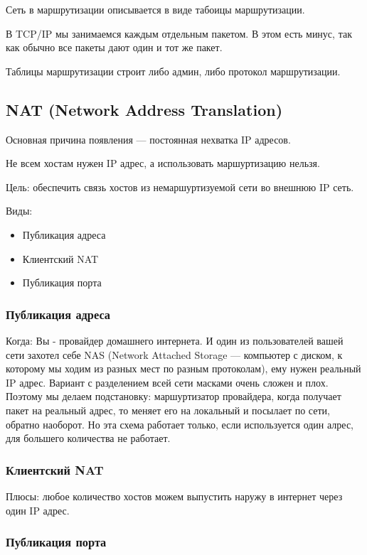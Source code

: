 \documentclass[10pt,a4paper,oneside,titlepage]{report}
\theoremstyle{defenition}
\begin{document}
Сеть в маршрутизации описывается в виде табоицы маршрутизации. 

В TCP/IP мы занимаемся каждым отдельным пакетом. В этом есть минус, так как обычно все пакеты дают один и тот же пакет.

Таблицы маршрутизации строит либо админ, либо протокол маршрутизации. 

\subsection{NAT (Network Address Translation)}

Основная причина появления --- постоянная нехватка IP адресов.

Не всем хостам нужен IP адрес, а использовать маршуртизацию нельзя.

Цель: обеспечить связь хостов из немаршуртизуемой сети во внешнюю IP сеть.

Виды:
\begin{itemize}
	\item Публикация адреса
	\item Клиентский NAT
	\item Публикация порта
\end{itemize}

\subsubsection{Публикация адреса}

Когда: Вы - провайдер домашнего интернета. И один из пользователей вашей сети захотел себе NAS (Network Attached Storage --- компьютер с диском, к которому мы ходим из разных мест по разным протоколам), ему нужен реальный IP адрес. Вариант с разделением всей сети масками очень сложен и плох. Поэтому мы делаем подстановку: маршуртизатор провайдера, когда получает пакет на реальный адрес, то меняет его на локальный и посылает по сети, обратно наоборот. Но эта схема работает только, если используется один алрес, для большего количества не работает.


\subsubsection{Клиентский NAT}



Плюсы: любое количество хостов можем выпустить наружу в интернет через один IP адрес.

\subsubsection{Публикация порта}
\end{document}
